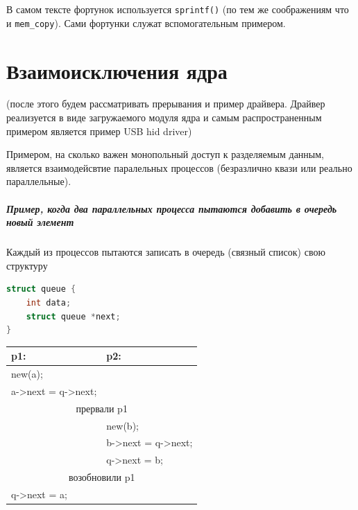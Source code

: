В самом тексте фортунок используется \verb|sprintf()| (по тем же соображениям что и \verb|mem_copy|). Сами фортунки служат вспомогательным примером.

\chapter{Взаимоисключения ядра}

(после этого будем рассматривать прерывания и пример драйвера. Драйвер реализуется в виде загружаемого модуля ядра и самым распространенным примером является пример USB hid driver)

Примером, на сколько важен монопольный доступ к разделяемым данным, является взаимодейсвтие паралельных процессов (безразлично квази или реально параллельные).

\paragraph{Пример, когда два параллельных  процесса пытаются добавить в очередь новый элемент}

Каждый из процессов пытаются записать в очередь (связный список) свою структуру
\begin{lstlisting}[language=c, caption=Структура queue]
struct queue {
	int data;
	struct queue *next;
}
\end{lstlisting}


\begin{table}[H]
\begin{tabular}{|l|l|}
\hline
p1: & p2: \\
\hline
new(a); & \\
a->next = q->next;  & \\
\hline
\multicolumn{2}{|c|}{прервали p1} \\
\hline
 & new(b); \\
 & b->next = q->next; \\
 & q->next = b; \\
\hline
\multicolumn{2}{|c|}{возобновили p1} \\
\hline
q->next = a; & \\
\hline
\end{tabular}
\end{table}

